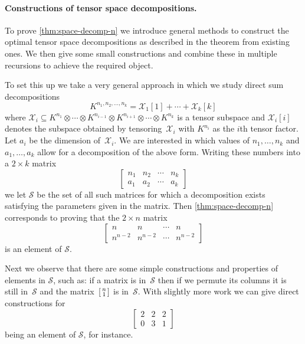\documentclass[11pt]{article}
\theoremstyle{definition}
\theoremstyle{remark}
\begin{document}
\paragraph{Constructions of tensor space decompositions.}

To prove %
\autoref{thm:space-decomp-n} we introduce general methods to construct the optimal tensor space decompositions as described in the theorem from existing ones. We then give some small constructions and combine these in multiple recursions to achieve the required object.

To set this up we take a very general approach in which we study direct sum decompositions 
\[
K^{n_1, n_2, \ldots, n_k} = \mathcal{X}_1[1] + \cdots + \mathcal{X}_k[k]
\]
where $\mathcal{X}_i \subseteq K^{n_1} \otimes \cdots \otimes K^{n_{i-1}} \otimes K^{n_{i+1}} \otimes \cdots \otimes K^{n_k}$ is a tensor subspace and $\mathcal{X}_i[i]$ denotes the subspace obtained by tensoring~$\mathcal{X}_i$ with $K^{n_i}$ as the $i$th tensor factor. Let $a_i$ be the dimension of~$\mathcal{X}_i$. We are interested in which values of $n_1, \ldots, n_k$ and $a_1, \ldots, a_k$ allow for a decomposition of the above form. Writing these numbers into a $2\times k$ matrix
\[
\begin{bmatrix} n_1 & n_2 & \cdots & n_k\\a_1 & a_2  & \cdots & a_k\end{bmatrix}
\]
we let $\mathcal{S}$ be the set of all such matrices for which a decomposition exists satisfying the parameters given in the matrix. Then \autoref{thm:space-decomp-n} corresponds to proving that the $2 \times n$ matrix
\begin{equation}\label{eq:base-case-n-intro}
\begin{bmatrix} n & n & \cdots & n\\n^{n-2} & n^{n-2}  & \cdots & n^{n-2}\end{bmatrix}
\end{equation}
is an element of $\mathcal{S}$. 

Next we observe that there are some simple constructions and properties of elements in $\mathcal{S}$, such as: if a matrix is in~$\mathcal{S}$ then if we permute its columns it is still in~$\mathcal{S}$ and the matrix~$\begin{bsmallmatrix} n\\1 \end{bsmallmatrix}$ is in~$\mathcal{S}$. With slightly more work we can give direct constructions for
\begin{equation}\label{eq:base-case-intro}
\begin{bmatrix} 2 & 2 & 2\\0 & 3 & 1\end{bmatrix}
\end{equation}
being an element of $\mathcal{S}$, for instance.
\end{document}
